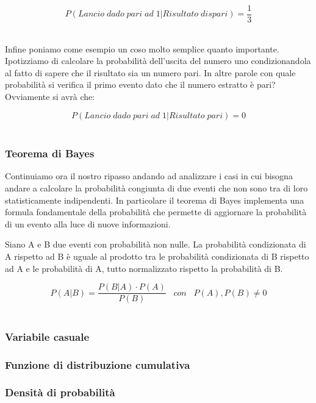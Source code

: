 \documentclass[../main.tex]{subfiles}
\begin{document}
\[P(\unit{Lancio\;dado\;pari\;ad\;}  1 | \unit{Risultato\; dispari}) = \frac{1}{3}\]\

Infine poniamo come esempio un coso molto semplice quanto importante. Ipotizziamo di calcolare la probabilità dell'uscita del numero uno condizionandola al fatto di sapere che il risultato sia un numero pari. In altre parole con quale probabilità si verifica il primo evento dato che il numero estratto è pari? Ovviamente si avrà che:


\[P(\unit{Lancio\;dado\;pari\;ad\;}  1 | \unit{Risultato\; pari}) = 0\]\

\subsubsection{Teorema di Bayes}

Continuiamo ora il nostro ripasso andando ad analizzare i casi in cui bisogna andare a calcolare la probabilità congiunta di due eventi che non sono tra di loro statisticamente indipendenti. In particolare il teorema di Bayes implementa una formula fondamentale della probabilità che permette di aggiornare la probabilità di un evento alla luce di nuove informazioni.

\begin{definition*}

Siano A e B due eventi con probabilità non nulle. La probabilità condizionata di A rispetto ad B è uguale al prodotto tra le probabilità condizionata di B rispetto ad A e le probabilità di A, tutto normalizzato rispetto la probabilità di B. 

\[ P(A|B) = \frac{P(B|A) \cdot P(A)}{P(B)}  \hspace{10pt} \unit{con} \hspace{10pt} P(A),P(B) \neq 0 \]\
	
\end{definition*}




\subsubsection{Variabile casuale}
\subsubsection{Funzione di distribuzione cumulativa}
\subsubsection{Densità di probabilità}
\end{document}
